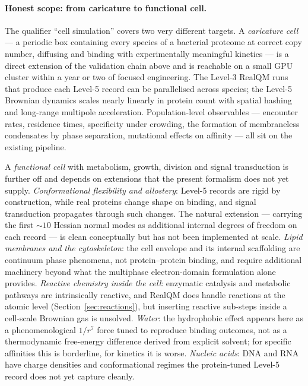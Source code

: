 \documentclass[11pt]{article}
\begin{document}
\paragraph{Honest scope: from caricature to functional cell.}
The qualifier ``cell simulation'' covers two very different targets. A \emph{caricature cell} --- a periodic box containing every species of a bacterial proteome at correct copy number, diffusing and binding with experimentally meaningful kinetics --- is a direct extension of the validation chain above and is reachable on a small GPU cluster within a year or two of focused engineering. The Level-3 RealQM runs that produce each Level-5 record can be parallelised across species; the Level-5 Brownian dynamics scales nearly linearly in protein count with spatial hashing and long-range multipole acceleration. Population-level observables --- encounter rates, residence times, specificity under crowding, the formation of membraneless condensates by phase separation, mutational effects on affinity --- all sit on the existing pipeline.

A \emph{functional cell} with metabolism, growth, division and signal transduction is further off and depends on extensions that the present formalism does not yet supply. \emph{Conformational flexibility and allostery}: Level-5 records are rigid by construction, while real proteins change shape on binding, and signal transduction propagates through such changes. The natural extension --- carrying the first $\sim 10$ Hessian normal modes as additional internal degrees of freedom on each record --- is clean conceptually but has not been implemented at scale. \emph{Lipid membranes and the cytoskeleton}: the cell envelope and its internal scaffolding are continuum phase phenomena, not protein--protein binding, and require additional machinery beyond what the multiphase electron-domain formulation alone provides. \emph{Reactive chemistry inside the cell}: enzymatic catalysis and metabolic pathways are intrinsically reactive, and RealQM does handle reactions at the atomic level (Section~\ref{sec:reactions}), but inserting reactive sub-steps inside a cell-scale Brownian gas is unsolved. \emph{Water}: the hydrophobic effect appears here as a phenomenological $1/r^7$ force tuned to reproduce binding outcomes, not as a thermodynamic free-energy difference derived from explicit solvent; for specific affinities this is borderline, for kinetics it is worse. \emph{Nucleic acids}: DNA and RNA have charge densities and conformational regimes the protein-tuned Level-5 record does not yet capture cleanly.
\end{document}
